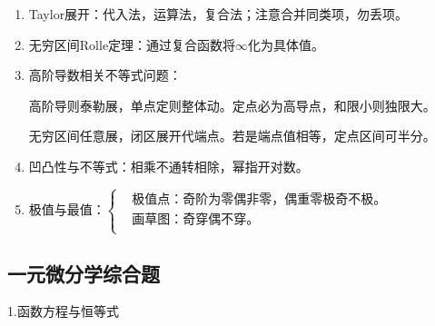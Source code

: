 \documentclass[UTF8]{ctexart}
\numberwithin{equation}{section}
\numberwithin{figure}{section}
\numberwithin{table}{section}
\newcommand\no{\noindent}
\begin{document}
\begin{spacing}{2}
\begin{enumerate}[itemindent=1.4em, label=(\arabic*)]
\item Taylor展开：代入法，运算法，复合法；注意合并同类项，勿丢项。

\item 无穷区间Rolle定理：通过复合函数将$\infty$化为具体值。

\item 高阶导数相关不等式问题：

高阶导则泰勒展，单点定则整体动。定点必为高导点，和限小则独限大。

无穷区间任意展，闭区展开代端点。若是端点值相等，定点区间可半分。

\item 凹凸性与不等式：相乘不通转相除，幂指开对数。

\item $\text{极值与最值：}\left\{\begin{aligned}
&\text{极值点：奇阶为零偶非零，偶重零极奇不极。}\\
&\text{画草图：奇穿偶不穿。}\\
\end{aligned}\right.$
\end{enumerate}

\subsection{一元微分学综合题}

\no1.函数方程与恒等式

\begin{enumerate}[itemindent=1.4em, label=(\arabic*)]



\end{enumerate}
\end{spacing}
\end{document}
